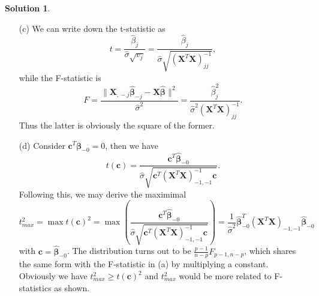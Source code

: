 \documentclass[11pt,letterpaper,english,oneside]{article} %
\theoremstyle{definition} %
\newtheorem{solution}{Solution}
\newenvironment{sol}{\begin{solution}\hspace{0pt}}{\end{solution}}
\begin{document}
\begin{sol}
\begin{itemize}
\item[(c)] We can write down the t-statistic as
$$
        t = \frac{\hat{\beta}_j}{\hat{\sigma}\sqrt{v_j}} = 
        \frac{\hat{\beta}_j}{\hat{\sigma}\sqrt{(\bm X^T \bm X)_{jj}^{-1}}},
$$
while the F-statistic is
$$
    F = \frac{\|\bm X_{\dot,-j}\hat{\bm \beta}_{-j} - \bm X \hat{\bm \beta}\|^2}{\hat{\sigma}^2} = \frac{\hat{\beta}_j^2}{\hat{\sigma}^2{(\bm X^T \bm X)_{jj}^{-1}}}.
$$
Thus the latter is obviously the square of the former.

\item[(d)] Consider $\bm c^T \bm \beta_{-0} = 0$, then we have
$$
    t(\bm c) = \frac{\bm c^T \hat{\bm \beta}_{-0}}{\hat{\sigma}\sqrt{\bm c^T (\bm X^T \bm X)_{-1, -1}^{-1} \bm c}}.
$$
Following this, we may derive the maximimal 
$$
 t_{max}^2 = \max t(\bm c)^2 = \max \left( \frac{\bm c^T \hat{\bm \beta}_{-0}}{\hat{\sigma}\sqrt{\bm c^T (\bm X^T \bm X)_{-1, -1}^{-1} \bm c}} \right) = \frac{1}{\hat{\sigma}^2}{\hat{\bm \beta}_{-0}^T (\bm X^T \bm X)_{-1, -1} \hat{\bm \beta}_{-0}}
$$
with $\bm c = \hat{\bm \beta}_{-0}$. The distribution turns out to be $\frac{p-1}{n-p}F_{p-1, n-p}$, which shares the same form with the F-statistic in (a) by multiplying a constant. Obviously we have $t_{max}^2 \ge t(\bm c)^2$ and $t_{max}^2$ would be more related to F-statistics as shown.
    \end{itemize}
    \end{sol}
\end{document}

